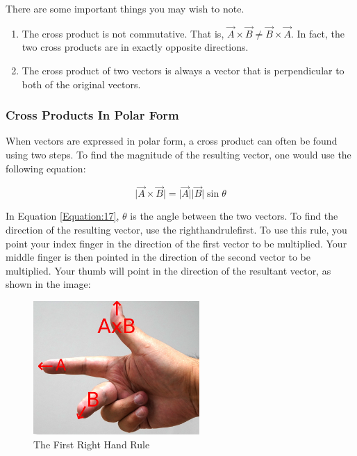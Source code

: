 	There are some important things you may wish to note.  
	\begin{enumerate}
		\item The cross product is not commutative.  That is, $\vec{A} \times \vec{B} \neq \vec{B} \times \vec{A}$.  In fact, the two cross products are in exactly opposite directions.  
		\item The cross product of two vectors is always a vector that is perpendicular to both of the original vectors.  
	\end{enumerate}


\subsubsection{Cross Products In Polar Form}
	When vectors are expressed in polar form, a cross product can often be found using two steps.  To find the magnitude of the resulting vector, one would use the following equation:
	
\begin{mdframed}[backgroundcolor=orange!20!white]
	\begin{equation}
	\lvert \vec{A} \times \vec{B} \rvert = 	\lvert \vec{A} \rvert \lvert\vec{B} \rvert \sin \theta
	\label{Equation:17}
	\end{equation}
\end{mdframed}	

\label{RHR1}
In Equation \ref{Equation:17}, $\theta$ is the angle between the two vectors.  To find the direction of the resulting vector, use the \gls{righthandrulefirst}.    To use this rule, you point your index finger in the direction of the first vector to be multiplied.  Your middle finger is then pointed in the direction of the second vector to be multiplied.  Your thumb will point in the direction of the resultant vector, as shown in the image: 

\begin{center}
	\begin{figure}[h]
		\centering
	\includegraphics[height=2in]{./Chapters/Ch01-intro/righthandrule.JPG}	
	\caption{The First Right Hand Rule}
	\end{figure}
	
\end{center}

